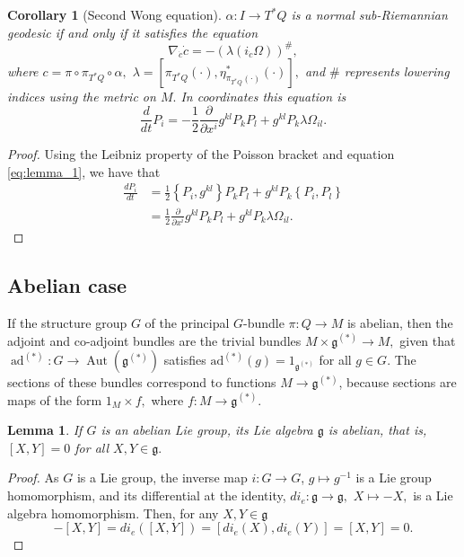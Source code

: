 \documentclass[12pt, letterpaper, reqno]{amsart}
\theoremstyle{definition}
\theoremstyle{plain}
\newtheorem{lm}{Lemma}
\newtheorem{cor}{Corollary}
\theoremstyle{remark}
\providecommand{\DIFaddbegin}{} %
\providecommand{\DIFaddend}{} %
\providecommand{\DIFdelbegin}{} %
\providecommand{\DIFdelend}{} %
\newcommand{\DIFscaledelfig}{0.5}
\newlength{\DIFdelgraphicswidth} %
\newlength{\DIFdelgraphicsheight} %
\newcommand{\DIFaddincludegraphics}[2][]{{\color{blue}\fbox{\DIFOincludegraphics[#1]{#2}}}} %
\newcommand{\DIFdelincludegraphics}[2][]{%
\sbox{\DIFdelgraphicsbox}{\DIFOincludegraphics[#1]{#2}}%
\settoboxwidth{\DIFdelgraphicswidth}{\DIFdelgraphicsbox} %
\settoboxtotalheight{\DIFdelgraphicsheight}{\DIFdelgraphicsbox} %
\scalebox{\DIFscaledelfig}{%
\parbox[b]{\DIFdelgraphicswidth}{\usebox{\DIFdelgraphicsbox}\\[-\baselineskip] \rule{\DIFdelgraphicswidth}{0em}}\llap{\resizebox{\DIFdelgraphicswidth}{\DIFdelgraphicsheight}{%
\setlength{\unitlength}{\DIFdelgraphicswidth}%
\begin{picture}(1,1)%
\thicklines\linethickness{2pt} %
{\color[rgb]{1,0,0}\put(0,0){\framebox(1,1){}}}%
{\color[rgb]{1,0,0}\put(0,0){\line( 1,1){1}}}%
{\color[rgb]{1,0,0}\put(0,1){\line(1,-1){1}}}%
\end{picture}%
}\hspace*{3pt}}} %
} %
\DeclareRobustCommand{\DIFaddbegin}{\DIFOaddbegin \let\includegraphics\DIFaddincludegraphics} %
\DeclareRobustCommand{\DIFaddend}{\DIFOaddend \let\includegraphics\DIFOincludegraphics} %
\DeclareRobustCommand{\DIFdelbegin}{\DIFOdelbegin \let\includegraphics\DIFdelincludegraphics} %
\DeclareRobustCommand{\DIFdelend}{\DIFOaddend \let\includegraphics\DIFOincludegraphics} %
\begin{document}
\DIFdelbegin %
\DIFdelend \DIFaddbegin \begin{cor}[Second Wong equation]\DIFaddend \label{cor:swe}
	$ \alpha: I \rightarrow T^*Q $ is a normal sub-Riemannian geodesic if and only if it satisfies the equation
	$$ \nabla_{\dot{c}}\dot{c} = -( \lambda(i_{\dot{c}}\Omega))^{\#}, $$ 
	where $ c = \pi\circ\pi_{T^*Q}\circ\alpha, $ $\lambda = [\pi_{T^*Q}(\cdot), \eta^*_{\pi_{T^*Q}(\cdot)}(\cdot)], $ and $ \# $ represents lowering indices using the metric on $ M. $ In coordinates this equation is
	$$ \frac{d}{dt} P_i = - \frac{1}{2} \frac{\partial }{\partial x^i} g^{kl}P_kP_l + g^{kl}P_k \lambda \Omega_{il}. $$ 
\end{cor}
\begin{proof}
	Using the Leibniz property of the Poisson bracket and equation \eqref{eq:lemma_1}, we have that
	\begin{align*}
		\frac{d P_i}{dt} &= \frac{1}{2} \left\{ P_i, g^{kl} \right\} P_kP_l+ g^{kl} P_k \left\{ P_i, P_l \right\} \\&= \frac{1}{2} \frac{\partial }{\partial x^i} g^{kl} P_k P_l + g^{kl} P_k\lambda \Omega_{il}.
	\end{align*}
\end{proof}

\subsection{Abelian case}%
\label{sub:abelian_case}

If the structure group $ G $ of the principal $ G $-bundle $ \pi: Q \rightarrow M $ is abelian, then the adjoint and co-adjoint bundles are the trivial bundles $ M\times \mathfrak{g}^{(*)} \rightarrow M, $ given that $ \operatorname{ad}^{(*)} : G \rightarrow \operatorname{Aut} ( \mathfrak{g}^{(*)}) $ satisfies $ \operatorname{ad^{(*)}} (g)= 1_{ \mathfrak{g}^{(*)}} $ for all $ g\in G. $ The sections of these bundles correspond to functions $ M \rightarrow \mathfrak{g}^{(*)} $, because sections are maps of the form $ 1_M\times f, $ where $ f: M \rightarrow \mathfrak{g}^{(*)}.$ 

\begin{lm}\label{lm:minus_inverse}
	If $ G $ is an abelian Lie group, its Lie algebra $ \mathfrak{g} $ is abelian, that is, $ [X,Y]=0 $ for all $ X,Y\in \mathfrak{g}. $ 
\end{lm}
\begin{proof}
	As $ G $ is a Lie group, the inverse map $ i : G \rightarrow G $, $ g \mapsto g^{-1} $ is a Lie group homomorphism, and its differential at the identity, $di_e: \mathfrak{g} \rightarrow \mathfrak{g},  $ $ X \mapsto -X, $ is a Lie algebra homomorphism. Then, for any $ X,Y\in \mathfrak{g} $ 
	$$ -[X,Y] = di_e([X,Y]) = [di_e(X), di_e(Y)] = [X,Y]=0. $$ 
\end{proof}
\end{document}

